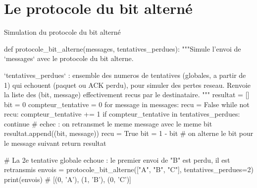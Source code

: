 \section{Le protocole du bit alterné}



\begin{codereference}{Simulation du protocole du bit alterné}
\begin{python}
def protocole_bit_alterne(messages, tentatives_perdues):
    """Simule l'envoi de `messages` avec le protocole du bit alterne.

    `tentatives_perdues` : ensemble des numeros de tentatives (globales, a partir de 1)
    qui echouent (paquet ou ACK perdu), pour simuler des pertes reseau.
    Renvoie la liste des (bit, message) effectivement recus par le destinataire.
    """
    resultat = []
    bit = 0
    compteur_tentative = 0
    for message in messages:
        recu = False
        while not recu:
            compteur_tentative += 1
            if compteur_tentative in tentatives_perdues:
                continue  # echec : on retransmet le meme message avec le meme bit
            resultat.append((bit, message))
            recu = True
        bit = 1 - bit  # on alterne le bit pour le message suivant
    return resultat

# La 2e tentative globale echoue : le premier envoi de "B" est perdu, il est retransmis
envois = protocole_bit_alterne(["A", "B", "C"], tentatives_perdues={2})
print(envois)  # [(0, 'A'), (1, 'B'), (0, 'C')]
\end{python}
\end{codereference}

